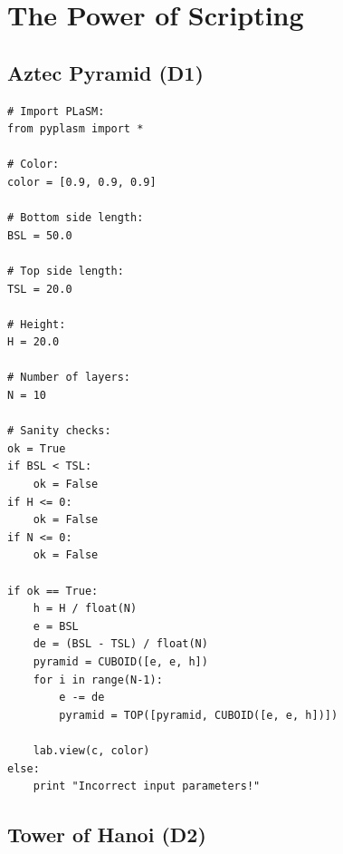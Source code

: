 \documentclass[article,A4,12pt]{llncs}
\begin{document}





\section{The Power of Scripting}

\subsection{Aztec Pyramid (D1)}

\begin{verbatim}
# Import PLaSM:
from pyplasm import *

# Color:
color = [0.9, 0.9, 0.9]

# Bottom side length:
BSL = 50.0

# Top side length:
TSL = 20.0

# Height:
H = 20.0

# Number of layers:
N = 10

# Sanity checks:
ok = True
if BSL < TSL: 
    ok = False
if H <= 0:
    ok = False
if N <= 0:
    ok = False

if ok == True:
    h = H / float(N)
    e = BSL
    de = (BSL - TSL) / float(N)
    pyramid = CUBOID([e, e, h])
    for i in range(N-1):
        e -= de
        pyramid = TOP([pyramid, CUBOID([e, e, h])])
    
    lab.view(c, color)
else:
    print "Incorrect input parameters!"
\end{verbatim}

\subsection{Tower of Hanoi (D2)}
\end{document}
